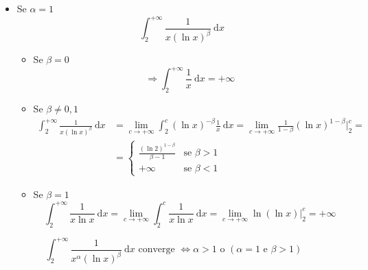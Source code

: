 \begin{exbar}
\begin{example}
\begin{itemize}
		\item Se $\alpha=1$
		\begin{equation*}
			 \int_{2}^{+\infty} \frac{1}{x(\ln x)^\beta} \ \mathrm{d}x
		\end{equation*}
		\begin{itemize}
			\item Se $\beta=0$
			\begin{equation*}
				\Rightarrow \int_{2}^{+\infty} \frac{1}{x} \ \mathrm{d}x =+\infty
			\end{equation*}
			
			\item Se $\beta \neq 0,1$
			\begin{align*}
				\int_{2}^{+\infty} \frac{1}{x(\ln x)^\beta} \ \mathrm{d}x 
				&= \lim_{c \rightarrow +\infty} \int_{2}^{c} (\ln x)^{-\beta} \frac{1}{x} \ \mathrm{d}x = \lim_{c \rightarrow +\infty} \frac{1}{1-\beta} (\ln x)^{1-\beta} \bigg|_{2}^{c} = 
				\\
				&= 
				\begin{cases}
					\frac{(\ln 2)^{1-\beta}}{\beta - 1} & \text{se } \beta > 1
					\\[1em]
					+\infty & \text{se } \beta < 1
				\end{cases}
			\end{align*}
			
			\item Se $\beta = 1$
			\begin{equation*}
			 	\int_{2}^{+\infty} \frac{1}{x \ln x} \ \mathrm{d}x = \lim_{c \rightarrow +\infty} \int_{2}^{c} \frac{1}{x \ln x} \ \mathrm{d}x = \lim_{c\rightarrow +\infty} \ln(\ln x)\bigg|_{2}^{c} = +\infty
			\end{equation*}
		\end{itemize}
	\end{itemize}	
\end{example}
\end{exbar}


\begin{attbar}
\begin{equation*}
		\int_{2}^{+\infty} \frac{1}{x^\alpha(\ln x)^\beta} \ \mathrm{d}x \text{ converge } \iff \alpha > 1 \text{ o } (\alpha=1 \text{ e } \beta >1)
\end{equation*}
\end{attbar}


